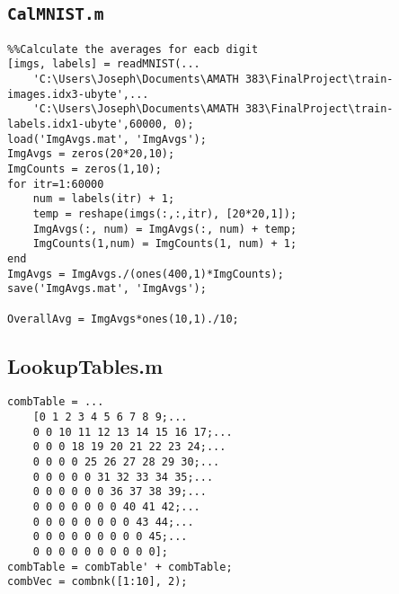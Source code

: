 \documentclass[]{article}
\theoremstyle{plain}
\theoremstyle{definition}
\begin{document}
\subsection{\texttt{CalMNIST.m}}
\begin{verbatim}
%%Calculate the averages for eacb digit
[imgs, labels] = readMNIST(...
    'C:\Users\Joseph\Documents\AMATH 383\FinalProject\train-images.idx3-ubyte',...
    'C:\Users\Joseph\Documents\AMATH 383\FinalProject\train-labels.idx1-ubyte',60000, 0);
load('ImgAvgs.mat', 'ImgAvgs');
ImgAvgs = zeros(20*20,10);
ImgCounts = zeros(1,10);
for itr=1:60000
    num = labels(itr) + 1;
    temp = reshape(imgs(:,:,itr), [20*20,1]);
    ImgAvgs(:, num) = ImgAvgs(:, num) + temp;
    ImgCounts(1,num) = ImgCounts(1, num) + 1;
end
ImgAvgs = ImgAvgs./(ones(400,1)*ImgCounts);
save('ImgAvgs.mat', 'ImgAvgs');

OverallAvg = ImgAvgs*ones(10,1)./10;

\end{verbatim}
\subsection{LookupTables.m}
\begin{verbatim}
combTable = ...
    [0 1 2 3 4 5 6 7 8 9;...
    0 0 10 11 12 13 14 15 16 17;...
    0 0 0 18 19 20 21 22 23 24;...
    0 0 0 0 25 26 27 28 29 30;...
    0 0 0 0 0 31 32 33 34 35;...
    0 0 0 0 0 0 36 37 38 39;...
    0 0 0 0 0 0 0 40 41 42;...
    0 0 0 0 0 0 0 0 43 44;...
    0 0 0 0 0 0 0 0 0 45;...
    0 0 0 0 0 0 0 0 0 0];
combTable = combTable' + combTable;
combVec = combnk([1:10], 2);
\end{verbatim}
\end{document}
